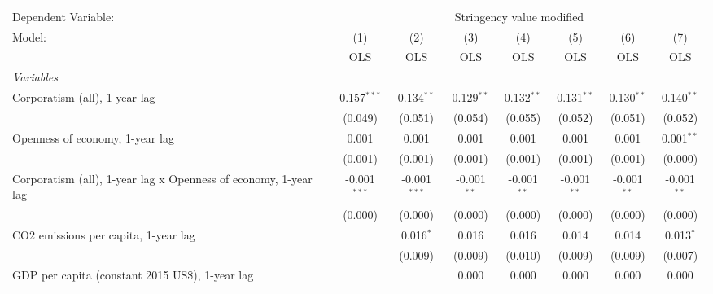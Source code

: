 
\begingroup
\centering
\begin{tabular}{lccccccc}
   \toprule
   Dependent Variable: & \multicolumn{7}{c}{Stringency value modified}\\
   Model:                                                          & (1)            & (2)            & (3)           & (4)           & (5)           & (6)           & (7)\\  
                                                                   &  OLS           & OLS            & OLS           & OLS           & OLS           & OLS           & OLS\\  
   \midrule
   \emph{Variables}\\
   Corporatism (all), 1-year lag                                   & 0.157$^{***}$  & 0.134$^{**}$   & 0.129$^{**}$  & 0.132$^{**}$  & 0.131$^{**}$  & 0.130$^{**}$  & 0.140$^{**}$\\   
                                                                   & (0.049)        & (0.051)        & (0.054)       & (0.055)       & (0.052)       & (0.051)       & (0.052)\\   
   Openness of economy, 1-year lag                                 & 0.001          & 0.001          & 0.001         & 0.001         & 0.001         & 0.001         & 0.001$^{**}$\\   
                                                                   & (0.001)        & (0.001)        & (0.001)       & (0.001)       & (0.001)       & (0.001)       & (0.000)\\   
   Corporatism (all), 1-year lag x Openness of economy, 1-year lag & -0.001$^{***}$ & -0.001$^{***}$ & -0.001$^{**}$ & -0.001$^{**}$ & -0.001$^{**}$ & -0.001$^{**}$ & -0.001$^{**}$\\   
                                                                   & (0.000)        & (0.000)        & (0.000)       & (0.000)       & (0.000)       & (0.000)       & (0.000)\\   
   CO2 emissions per capita, 1-year lag                            &                & 0.016$^{*}$    & 0.016         & 0.016         & 0.014         & 0.014         & 0.013$^{*}$\\   
                                                                   &                & (0.009)        & (0.009)       & (0.010)       & (0.009)       & (0.009)       & (0.007)\\   
   GDP per capita (constant 2015 US\$), 1-year lag                 &                &                & 0.000         & 0.000         & 0.000         & 0.000         & 0.000\\   

\end{tabular}

